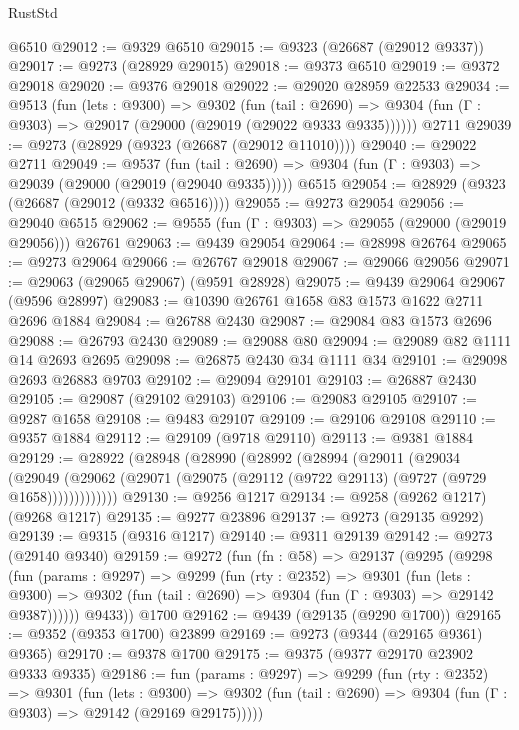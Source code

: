 \begin{lexlean}{RustStd}
\begin{coremodule}
    @6510
@29012 := @9329 @6510
@29015 := @9323 (@26687 (@29012 @9337))
@29017 := @9273 (@28929 @29015)
@29018 := @9373 @6510
@29019 := @9372 @29018
@29020 := @9376 @29018
@29022 := @29020 @28959 @22533
@29034 := @9513
    (fun (lets : @9300) =>
    @9302
      (fun (tail : @2690) =>
      @9304 (fun (Γ : @9303) => @29017 (@29000 (@29019 (@29022 @9333 @9335))))))
    @2711
@29039 := @9273 (@28929 (@9323 (@26687 (@29012 @11010))))
@29040 := @29022 @2711
@29049 := @9537
    (fun (tail : @2690) => @9304 (fun (Γ : @9303) => @29039 (@29000 (@29019 (@29040 @9335)))))
    @6515
@29054 := @28929 (@9323 (@26687 (@29012 (@9332 @6516))))
@29055 := @9273 @29054
@29056 := @29040 @6515
@29062 := @9555 (fun (Γ : @9303) => @29055 (@29000 (@29019 @29056))) @26761
@29063 := @9439 @29054
@29064 := @28998 @26764
@29065 := @9273 @29064
@29066 := @26767 @29018
@29067 := @29066 @29056
@29071 := @29063 (@29065 @29067) (@9591 @28928)
@29075 := @9439 @29064 @29067 (@9596 @28997)
@29083 := @10390 @26761 @1658 @83 @1573 @1622 @2711 @2696 @1884
@29084 := @26788 @2430
@29087 := @29084 @83 @1573 @2696
@29088 := @26793 @2430
@29089 := @29088 @80
@29094 := @29089 @82 @1111 @14 @2693 @2695
@29098 := @26875 @2430 @34 @1111 @34
@29101 := @29098 @2693 @26883 @9703
@29102 := @29094 @29101
@29103 := @26887 @2430
@29105 := @29087 (@29102 @29103)
@29106 := @29083 @29105
@29107 := @9287 @1658
@29108 := @9483 @29107
@29109 := @29106 @29108
@29110 := @9357 @1884
@29112 := @29109 (@9718 @29110)
@29113 := @9381 @1884
@29129 := @28922
    (@28948
      (@28990
        (@28992
          (@28994
            (@29011
              (@29034
                (@29049
                  (@29062 (@29071 (@29075 (@29112 (@9722 @29113) (@9727 (@9729 @1658)))))))))))))
@29130 := @9256 @1217
@29134 := @9258 (@9262 @1217) (@9268 @1217)
@29135 := @9277 @23896
@29137 := @9273 (@29135 @9292)
@29139 := @9315 (@9316 @1217)
@29140 := @9311 @29139
@29142 := @9273 (@29140 @9340)
@29159 := @9272
    (fun (fn : @58) =>
    @29137
      (@9295
        (@9298
          (fun (params : @9297) =>
          @9299
            (fun (rty : @2352) =>
            @9301
              (fun (lets : @9300) =>
              @9302 (fun (tail : @2690) => @9304 (fun (Γ : @9303) => @29142 @9387))))))
        @9433))
    @1700
@29162 := @9439 (@29135 (@9290 @1700))
@29165 := @9352 (@9353 @1700) @23899
@29169 := @9273 (@9344 (@29165 @9361) @9365)
@29170 := @9378 @1700
@29175 := @9375 (@9377 @29170 @23902 @9333 @9335)
@29186 := fun (params : @9297) =>
  @9299
    (fun (rty : @2352) =>
    @9301
      (fun (lets : @9300) =>
      @9302 (fun (tail : @2690) => @9304 (fun (Γ : @9303) => @29142 (@29169 @29175)))))

\end{coremodule}
\end{lexlean}

